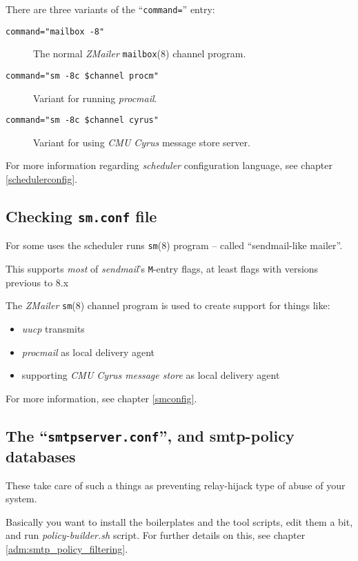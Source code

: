There are three variants of the ``{\tt command=}'' entry:
\begin{description}
\item[{\tt command="mailbox -8"}] \mbox{}

The normal {\em ZMailer} {\tt mailbox}(8) channel program.

\item[{\tt command="sm -8c \$channel procm"}] \mbox{}

Variant for running {\em procmail}.

\item[{\tt command="sm -8c \$channel cyrus"}] \mbox{}

Variant for using {\em CMU Cyrus} message store server.
\end{description}

For more information regarding {\em scheduler} configuration language,
see chapter \vref{schedulerconfig}.

\subsection{Checking {\tt sm.conf} file}%

For some uses the scheduler runs {\tt sm}(8) program -- called
``sendmail-like mailer''.

This supports {\em most} of {\em sendmail}'s {\tt M}-entry flags,
at least flags with versions previous to 8.x

The {\em ZMailer} {\tt sm}(8) channel program is used to create support
for things like:
\begin{itemize}
\item {\em uucp} transmits
\item {\em procmail} as local delivery agent
\item supporting {\em CMU Cyrus message store} as local delivery agent
\end{itemize}

For more information, see chapter \vref{smconfig}.


\subsection{The ``{\tt smtpserver.conf}'', and smtp-policy databases}

These take care of such a things as preventing relay-hijack type
of abuse of your system.

Basically you want to install the boilerplates and the tool scripts,
edit them a bit, and run {\em policy-builder.sh} script.
For further details on this, see chapter \vref{adm:smtp_policy_filtering}.

